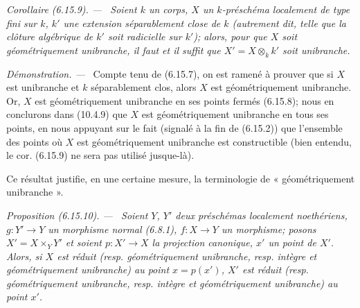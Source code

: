 \documentclass[10pt,oneside]{book}
\newcommand{\oldpage}[2][]{%
  \setcounter{footnote}{0}%
  \marginpar{\scriptsize\textbf{#1}~|~#2}\ignorespaces}
\newenvironment{proposition}[1][]{%
  \par\medskip\noindent\itshape Proposition (#1). ---\ }{\par}
\newenvironment{corollary}[1][]{%
  \par\medskip\noindent\itshape Corollaire (#1). ---\ }{\par}
\newenvironment{proof}{%
  \par\medskip\noindent\textit{Démonstration. ---\ }}{\par}
\begin{document}
\begin{corollary}[6.15.9]
\label{IV.2.s6.15.9-fr}
Soient $k$ un corps, $X$ un $k$-préschéma localement de type fini sur $k$,
$k'$ une extension séparablement close de $k$ (autrement dit, telle que la
clôture algébrique de $k'$ soit radicielle sur $k'$); alors, pour que $X$
soit géométriquement unibranche, il faut et il suffit que
$X'=X\otimes_k k'$ soit unibranche.
\end{corollary}

\begin{proof}
Compte tenu de (6.15.7), on est ramené à prouver que si $X$ est unibranche
et $k$ séparablement clos, alors $X$ est géométriquement unibranche. Or, $X$
est géométriquement unibranche en ses points fermés (6.15.8); nous en
conclurons dans (10.4.9) que $X$ est géométriquement unibranche en tous ses
points, en nous appuyant sur le fait (signalé à la fin de (6.15.2)) que
l'ensemble des points où $X$ est géométriquement unibranche est
constructible (bien entendu, le cor. (6.15.9) ne sera pas utilisé
jusque-là).
\end{proof}

Ce résultat justifie, en une certaine mesure, la terminologie de
« géométriquement unibranche ».

\oldpage[IV-2]{181}
\begin{proposition}[6.15.10]
\label{IV.2.s6.15.10-fr}
Soient $Y$, $Y'$ deux préschémas localement noethériens, $g:Y'\to Y$ un
morphisme normal (6.8.1), $f:X\to Y$ un morphisme; posons
$X'=X\times_Y Y'$ et soient $p:X'\to X$ la projection canonique, $x'$ un
point de $X'$. Alors, si $X$ est réduit (resp. géométriquement unibranche,
resp. intègre et géométriquement unibranche) au point $x=p(x')$, $X'$ est
réduit (resp. géométriquement unibranche, resp. intègre et
géométriquement unibranche) au point $x'$.
\end{proposition}
\end{document}
